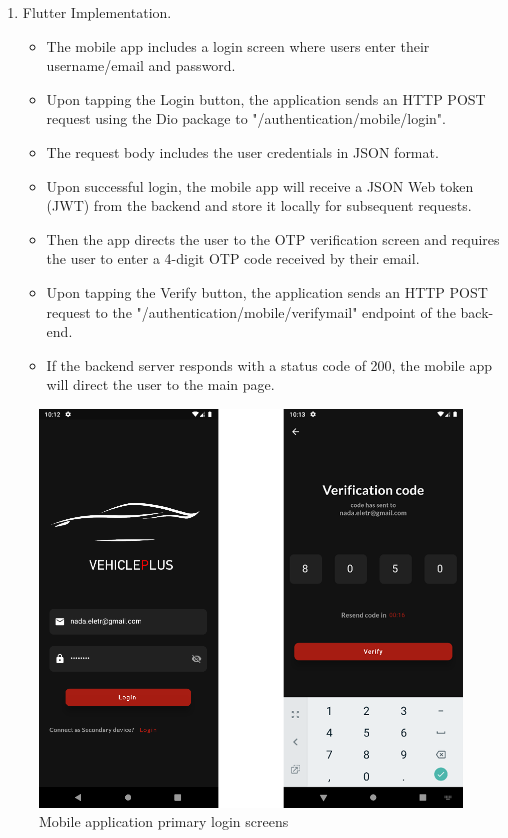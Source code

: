 \documentclass[
12pt,
oneside, 
onehalfspacing, 
nolistspacing, 
parskip, 
chapterinoneline, 
]{AASTCOMPUTER}
\begin{document}
\begin{enumerate}
\item Flutter Implementation.
\begin{itemize}
\item The mobile app includes a login screen where users enter their username/email and password.
\item Upon tapping the Login button, the application sends an HTTP POST request using the Dio package to "/authentication/mobile/login".
\item The request body includes the user credentials in JSON format.
\item Upon successful login, the mobile app will receive a JSON Web token (JWT) from the backend and store it locally for subsequent requests.
\item Then the app directs the user to the OTP verification screen and requires the user to enter a 4-digit OTP code received by their email.
\item Upon tapping the Verify button, the application sends an HTTP POST request to the "/authentication/mobile/verifymail" endpoint of the back-end.
\item If the backend server responds with a status code of 200, the mobile app will direct the user to the main page.
\end{itemize}
\end{enumerate}

\begin{figure}[!ht]
	\centering
	\includegraphics[scale=1]{Figures/mobileApp/1.png}
  	\caption{Mobile application primary login screens}
  	\label{fig:Mobile application primary login screens}
\end{figure}
\end{document}
